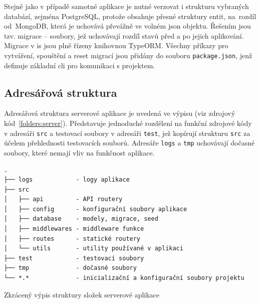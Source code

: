 Stejně jako v případě samotné aplikace je nutné verzovat i strukturu vybraných databází, zejména PostgreSQL, protože obsahuje přesné struktury entit, na~rozdíl od~\mbox{MongoDB}, která je uchovává převážně ve volném \gls{json} objektu. Řešením jsou tzv. migrace -- soubory, jež uchovávají rozdíl stavů před a po jejich aplikování. Migrace v \gls{is} jsou plně řízeny knihovnou TypeORM. Všechny příkazy pro vytváření, spouštění a reset migrací jsou přidány do souboru \texttt{package.json}, jenž definuje základní \gls{cli} pro komunikaci s projektem.





\subsection{Adresářová struktura}

Adresářová struktura serverové aplikace je uvedená ve výpisu (viz zdrojový kód~\ref{folders:server}). Představuje jednoduché rozdělení na funkční zdrojové kódy v adresáři \texttt{src} a testovací soubory v adresáři \texttt{test}, jež kopírují strukturu \texttt{src} za účelem přehlednosti testovacích souborů. Adresáře \texttt{logs} a \texttt{tmp} uchovávají dočasné soubory, které nemají vliv na funkčnost aplikace.

\begin{fig:code}
   \begin{verbatim}
.
├── logs            - logy aplikace
├── src
│   ├── api         - API routery
│   ├── config      - konfigurační soubory aplikace
│   ├── database    - modely, migrace, seed
│   ├── middlewares - middleware funkce
│   ├── routes      - statické routery
│   └── utils       - utility používané v aplikaci
├── test            - testovací soubory
├── tmp             - dočasné soubory
└── *.*             - inicializační a konfigurační soubory projektu
   \end{verbatim}
   \caption{Zkrácený výpis struktury složek serverové aplikace}\label{folders:server}
\end{fig:code}





